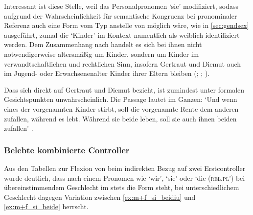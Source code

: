 Interessant ist diese Stelle, weil  das Personalpronomen
 `sie' modifiziert, sodass aufgrund der Wahrscheinlichkeit für
semantische Kongruenz bei pronominaler Referenz auch eine Form vom Typ
 anstelle von  möglich wäre, wie in \cref{sec:gendsex}
ausgeführt, zumal die  `Kinder' im Kontext namentlich als weiblich
identifiziert werden. Dem Zusammenhang nach handelt es sich bei ihnen nicht
notwendigerweise altersmäßig um Kinder, sondern um Kinder im
verwandt\-schaft\-lichen und rechtlichen Sinn, insofern Gertraut und Diemut
auch im Jugend- oder Erwachsenen\-alter Kinder ihrer Eltern bleiben
(\cites(Nr.~2960)[240,31+35]{cao4}; \cites(Nr.~2719, Nürnberg,
1297)[vgl.~auch][96,40--97,18]{cao4}; \cite[569, 619]{caor}).

Dass sich  direkt auf Gertraut und Diemut bezieht, ist
zumindest unter formalen Gesichtspunkten unwahrscheinlich. Die Passage lautet
im Ganzen:  `Und wenn eines der vorgenannten Kinder
stirbt, soll die vorgenannte Rente dem anderen zufallen, während es lebt.
Während sie beide leben, soll sie auch ihnen beiden zufallen'
\autocite[\pno~2960, 240,37--39]{cao4}.

\subsubsection{Belebte kombinierte Controller}

Aus den Tabellen  zur Flexion
von  beim indirekten Bezug auf zwei Erstcontroller wurde deutlich,
dass nach einem Pronomen wie
 `wir',  `sie' oder  `die
(\textsc{rel.pl')} bei übereinstimmendem Geschlecht im \CAO{} stets die Form
 steht, bei unterschiedlichem Geschlecht dagegen Variation zwischen
 \cref{ex:m+f_si_beidiu} und  \cref{ex:m+f_si_beide}
herrscht.

